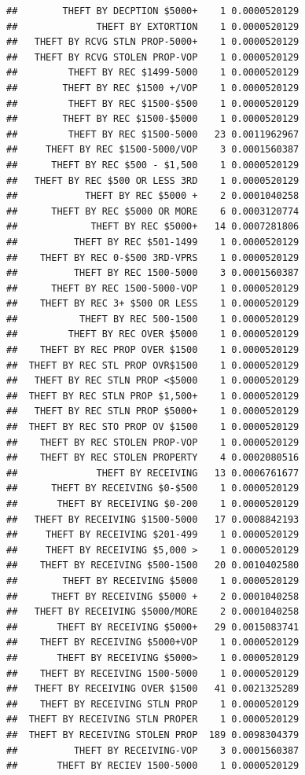 \documentclass[]{book}
\begin{document}
\begin{verbatim}
##        THEFT BY DECPTION $5000+    1 0.0000520129
##              THEFT BY EXTORTION    1 0.0000520129
##   THEFT BY RCVG STLN PROP-5000+    1 0.0000520129
##   THEFT BY RCVG STOLEN PROP-VOP    1 0.0000520129
##         THEFT BY REC $1499-5000    1 0.0000520129
##        THEFT BY REC $1500 +/VOP    1 0.0000520129
##         THEFT BY REC $1500-$500    1 0.0000520129
##        THEFT BY REC $1500-$5000    1 0.0000520129
##         THEFT BY REC $1500-5000   23 0.0011962967
##     THEFT BY REC $1500-5000/VOP    3 0.0001560387
##      THEFT BY REC $500 - $1,500    1 0.0000520129
##   THEFT BY REC $500 OR LESS 3RD    1 0.0000520129
##            THEFT BY REC $5000 +    2 0.0001040258
##      THEFT BY REC $5000 OR MORE    6 0.0003120774
##             THEFT BY REC $5000+   14 0.0007281806
##          THEFT BY REC $501-1499    1 0.0000520129
##    THEFT BY REC 0-$500 3RD-VPRS    1 0.0000520129
##          THEFT BY REC 1500-5000    3 0.0001560387
##      THEFT BY REC 1500-5000-VOP    1 0.0000520129
##    THEFT BY REC 3+ $500 OR LESS    1 0.0000520129
##           THEFT BY REC 500-1500    1 0.0000520129
##         THEFT BY REC OVER $5000    1 0.0000520129
##    THEFT BY REC PROP OVER $1500    1 0.0000520129
##  THEFT BY REC STL PROP OVR$1500    1 0.0000520129
##   THEFT BY REC STLN PROP <$5000    1 0.0000520129
##  THEFT BY REC STLN PROP $1,500+    1 0.0000520129
##   THEFT BY REC STLN PROP $5000+    1 0.0000520129
##  THEFT BY REC STO PROP OV $1500    1 0.0000520129
##    THEFT BY REC STOLEN PROP-VOP    1 0.0000520129
##    THEFT BY REC STOLEN PROPERTY    4 0.0002080516
##              THEFT BY RECEIVING   13 0.0006761677
##      THEFT BY RECEIVING $0-$500    1 0.0000520129
##       THEFT BY RECEIVING $0-200    1 0.0000520129
##   THEFT BY RECEIVING $1500-5000   17 0.0008842193
##     THEFT BY RECEIVING $201-499    1 0.0000520129
##     THEFT BY RECEIVING $5,000 >    1 0.0000520129
##    THEFT BY RECEIVING $500-1500   20 0.0010402580
##        THEFT BY RECEIVING $5000    1 0.0000520129
##      THEFT BY RECEIVING $5000 +    2 0.0001040258
##   THEFT BY RECEIVING $5000/MORE    2 0.0001040258
##       THEFT BY RECEIVING $5000+   29 0.0015083741
##    THEFT BY RECEIVING $5000+VOP    1 0.0000520129
##       THEFT BY RECEIVING $5000>    1 0.0000520129
##    THEFT BY RECEIVING 1500-5000    1 0.0000520129
##   THEFT BY RECEIVING OVER $1500   41 0.0021325289
##    THEFT BY RECEIVING STLN PROP    1 0.0000520129
##  THEFT BY RECEIVING STLN PROPER    1 0.0000520129
##  THEFT BY RECEIVING STOLEN PROP  189 0.0098304379
##          THEFT BY RECEIVING-VOP    3 0.0001560387
##       THEFT BY RECIEV 1500-5000    1 0.0000520129

\end{verbatim}
\end{document}
